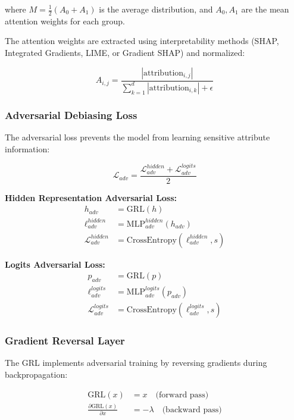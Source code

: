 \documentclass[11pt]{article}
\begin{document}
where $M = \frac{1}{2}(A_0 + A_1)$ is the average distribution, and $A_0, A_1$ are the mean attention weights for each group.

The attention weights are extracted using interpretability methods (SHAP, Integrated Gradients, LIME, or Gradient SHAP) and normalized:

\begin{equation}
    A_{i,j} = \frac{|\text{attribution}_{i,j}|}{\sum_{k=1}^{d} |\text{attribution}_{i,k}| + \epsilon}
\end{equation}

\subsubsection{Adversarial Debiasing Loss}
The adversarial loss prevents the model from learning sensitive attribute information:

\begin{equation}
    \mathcal{L}_{adv} = \frac{\mathcal{L}_{adv}^{hidden} + \mathcal{L}_{adv}^{logits}}{2}
\end{equation}

\textbf{Hidden Representation Adversarial Loss:}
\begin{align}
    h_{adv} &= \text{GRL}(h) \\
    \ell_{adv}^{hidden} &= \text{MLP}_{adv}^{hidden}(h_{adv}) \\
    \mathcal{L}_{adv}^{hidden} &= \text{CrossEntropy}(\ell_{adv}^{hidden}, s)
\end{align}

\textbf{Logits Adversarial Loss:}
\begin{align}
    p_{adv} &= \text{GRL}(p) \\
    \ell_{adv}^{logits} &= \text{MLP}_{adv}^{logits}(p_{adv}) \\
    \mathcal{L}_{adv}^{logits} &= \text{CrossEntropy}(\ell_{adv}^{logits}, s)
\end{align}

\subsubsection{Gradient Reversal Layer}
The GRL implements adversarial training by reversing gradients during backpropagation:

\begin{align}
    \text{GRL}(x) &= x \quad \text{(forward pass)} \\
    \frac{\partial \text{GRL}(x)}{\partial x} &= -\lambda \quad \text{(backward pass)}
\end{align}
\end{document}
